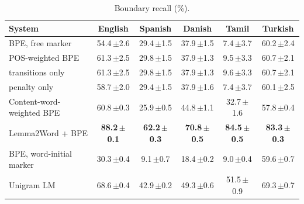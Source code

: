 \begin{table}[!ht]
\centering
\caption{Boundary recall (\%).}
\label{tab:recall}
\small
\setlength{\tabcolsep}{4pt}
\begin{tabular}{lccccc}
\toprule
System & English & Spanish & Danish & Tamil & Turkish \\
\midrule
BPE, free marker & 54.4\,{\scriptsize$\pm$2.6} & 29.4\,{\scriptsize$\pm$1.5} & 37.9\,{\scriptsize$\pm$1.5} & 7.4\,{\scriptsize$\pm$3.7} & 60.2\,{\scriptsize$\pm$2.4} \\
POS-weighted BPE & 61.3\,{\scriptsize$\pm$2.5} & 29.8\,{\scriptsize$\pm$1.5} & 37.9\,{\scriptsize$\pm$1.3} & 9.5\,{\scriptsize$\pm$3.3} & 60.7\,{\scriptsize$\pm$2.1} \\
\quad transitions only & 61.3\,{\scriptsize$\pm$2.5} & 29.8\,{\scriptsize$\pm$1.5} & 37.9\,{\scriptsize$\pm$1.3} & 9.6\,{\scriptsize$\pm$3.3} & 60.7\,{\scriptsize$\pm$2.1} \\
\quad penalty only & 58.7\,{\scriptsize$\pm$2.0} & 29.4\,{\scriptsize$\pm$1.5} & 37.9\,{\scriptsize$\pm$1.6} & 7.4\,{\scriptsize$\pm$3.7} & 60.1\,{\scriptsize$\pm$2.5} \\
\addlinespace[2pt]
Content-word-weighted BPE & 60.8\,{\scriptsize$\pm$0.3} & 25.9\,{\scriptsize$\pm$0.5} & 44.8\,{\scriptsize$\pm$1.1} & 32.7\,{\scriptsize$\pm$1.6} & 57.8\,{\scriptsize$\pm$0.4} \\
Lemma2Word + BPE & \textbf{88.2\,{\scriptsize$\pm$0.1}} & \textbf{62.2\,{\scriptsize$\pm$0.3}} & \textbf{70.8\,{\scriptsize$\pm$0.5}} & \textbf{84.5\,{\scriptsize$\pm$0.5}} & \textbf{83.3\,{\scriptsize$\pm$0.3}} \\
BPE, word-initial marker & 30.3\,{\scriptsize$\pm$0.4} & 9.1\,{\scriptsize$\pm$0.7} & 18.4\,{\scriptsize$\pm$0.2} & 9.0\,{\scriptsize$\pm$0.4} & 59.6\,{\scriptsize$\pm$0.7} \\
Unigram LM & 68.6\,{\scriptsize$\pm$0.4} & 42.9\,{\scriptsize$\pm$0.2} & 49.3\,{\scriptsize$\pm$0.6} & 51.5\,{\scriptsize$\pm$0.9} & 69.3\,{\scriptsize$\pm$0.7} \\
\bottomrule
\end{tabular}
\end{table}

